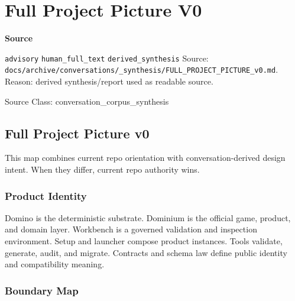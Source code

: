 \documentclass[9pt,a4paper,openany]{book}
\newcommand{\vonecallout}[3]{\par\medskip\noindent\begingroup\setlength{\fboxsep}{7pt}\colorbox{DomCalloutBg}{\parbox{0.94\linewidth}{\textbf{\textcolor{#1}{#2}}\par #3}}\endgroup\par\medskip}
\begin{document}
\section{Full Project Picture V0}

\vonecallout{DomSlate}{Source}{\texttt{advisory} \texttt{human\_\allowbreak{}full\_\allowbreak{}text} \texttt{derived\_\allowbreak{}synthesis} Source: \texttt{docs/\allowbreak{}archive/\allowbreak{}conversations/\allowbreak{}\_\allowbreak{}synthesis/\allowbreak{}FULL\_\allowbreak{}PROJECT\_\allowbreak{}PICTURE\_\allowbreak{}v0.\allowbreak{}md}.\allowbreak{} Reason: derived synthesis/\allowbreak{}report used as readable source.\allowbreak{}}

Source Class: conversation\_\allowbreak{}corpus\_\allowbreak{}synthesis



\subsection{Full Project Picture v0}

This map combines current repo orientation with conversation-\allowbreak{}derived design intent.\allowbreak{} When they differ, current repo authority wins.\allowbreak{}


\subsubsection{Product Identity}

Domino is the deterministic substrate.\allowbreak{} Dominium is the official game, product, and domain layer.\allowbreak{} Workbench is a governed validation and inspection environment.\allowbreak{} Setup and launcher compose product instances.\allowbreak{} Tools validate, generate, audit, and migrate.\allowbreak{} Contracts and schema law define public identity and compatibility meaning.\allowbreak{}


\subsubsection{Boundary Map}
\end{document}
